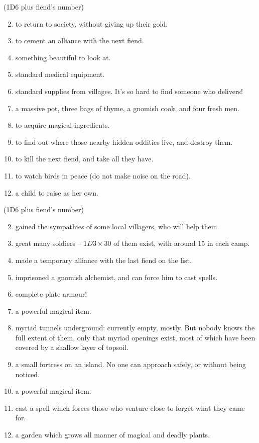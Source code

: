 \begin{multicols}{2}

(1D6 plus fiend's number)

\begin{enumerate}
\setcounter{enumi}{1}
\item
  to return to society, without giving up their gold.
\item
  to cement an alliance with the next fiend.
\item
  something beautiful to look at.
\item
  standard medical equipment.
\item
  standard supplies from villages. It's so hard to find someone who
  delivers!
\item
  a massive pot, three bags of thyme, a gnomish cook, and four fresh men.
\item
  to acquire magical ingredients.
\item
  to find out where those nearby hidden oddities live, and destroy them.
\item
  to kill the next fiend, and take all they have.
\item
  to watch birds in peace (do not make noise on the road).
\item
  a child to raise as her own.
\end{enumerate}


(1D6 plus fiend's number)

\begin{enumerate}
\setcounter{enumi}{1}
\item
  gained the sympathies of some local villagers, who will help them.
\item
  great many soldiers -- $1D3 \times 30$ of them exist, with around 15 in each
  camp.
\item
  made a temporary alliance with the last fiend on the list.
\item
  imprisoned a gnomish alchemist, and can force him to cast spells.
\item
  complete plate armour!
\item
  a powerful magical item.
\item
  myriad tunnels underground: currently empty, mostly. But nobody knows
  the full extent of them, only that myriad openings exist, most of
  which have been covered by a shallow layer of topsoil.
\item
  a small fortress on an island. No one can approach safely, or without
  being noticed.
\item
  a powerful magical item.
\item
  cast a spell which forces those who venture close to forget what they
  came for.
\item
  a garden which grows all manner of magical and deadly plants.
\end{enumerate}


\end{multicols}
